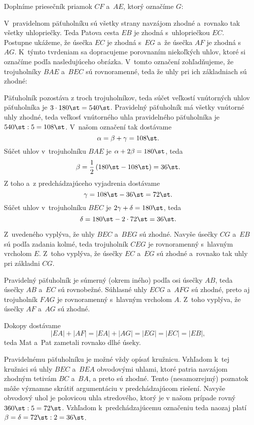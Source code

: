 {%
Doplníme priesečník priamok $CF$ a~$AE$, ktorý označíme $G$:
%


V~pravidelnom päťuholníku sú všetky strany navzájom zhodné a~rovnako tak všetky uhlopriečky.
Teda Patova cesta $EB$ je zhodná s~uhlopriečkou $EC$.
Postupne ukážeme, že úsečka $EC$ je zhodná s~$EG$ a~že úsečka $AF$ je zhodná s~$AG$.
K~týmto tvrdeniam sa dopracujeme porovnaním niekoľkých uhlov, ktoré si označíme podľa nasledujúceho obrázka.
V~tomto označení zohľadňujeme, že trojuholníky $BAE$ a~$BEC$ sú rovnoramenné, teda že uhly pri ich základniach sú zhodné:
%


Päťuholník pozostáva z troch trojuholníkov, teda súčet veľkostí vnútorných uhlov päťuholníka je $3\cdot180\st=540\st$.
Pravidelný päťuholník má všetky vnútorné uhly zhodné, teda veľkosť vnútorného uhla pravidelného päťuholníka je $540\st:5=108\st$.
V~našom označení tak dostávame
$$
\alpha=\beta+\gamma =108\st.
$$
Súčet uhlov v~trojuholníku $BAE$ je $\alpha+2\beta=180\st$, teda
$$
\beta=\frac12\left(180\st-108\st\right)=36\st.
$$
Z toho a~z predchádzajúceho vyjadrenia dostávame
$$
\gamma=108\st-36\st=72\st.
$$
Súčet uhlov v~trojuholníku $BEC$ je $2\gamma+\delta=180\st$, teda
$$
\delta=180\st-2\cdot72\st=36\st.
$$

Z~uvedeného vyplýva, že uhly $BEC$ a~$BEG$ sú zhodné.
Navyše úsečky $CG$ a~$EB$ sú podľa zadania kolmé, teda trojuholník $CEG$ je rovnoramenný s~hlavným vrcholom $E$.
Z~toho vyplýva, že úsečky $EC$ a~$EG$ sú zhodné a~rovnako tak uhly pri základni $CG$.

Pravidelný päťuholník je súmerný (okrem iného) podľa osi úsečky $AB$, teda úsečky $AB$ a~$EC$ sú rovnobežné.
Súhlasné uhly $ECG$ a~$AFG$ sú zhodné, preto aj trojuholník $FAG$ je rovnoramenný s~hlavným vrcholom $A$.
Z~toho vyplýva, že úsečky $AF$ a~$AG$ sú zhodné.

Dokopy dostávame
$$
|EA|+|AF| =|EA|+|AG| =|EG| =|EC| =|EB|,
$$
teda Mat a~Pat zametali rovnako dlhé úseky.
%


\poznamka
Pravidelnému päťuholníku je možné vždy opísať kružnicu.
Vzhľadom k~tej kružnici sú uhly $BEC$ a~$BEA$ obvodovými uhlami, ktoré patria navzájom zhodným tetivám $BC$ a~$BA$, a preto sú zhodné.
Tento (nesamozrejmý) poznatok môže významne skrátiť argumentáciu v predchádzajúcom riešení.
Navyše obvodový uhol je polovicou uhla stredového, ktorý je v našom prípade rovný $360\st:5=72\st$.
Vzhľadom k~predchádzajúcemu označeniu teda naozaj platí $\beta=\delta=72\st:2=36\st$.
%

}

